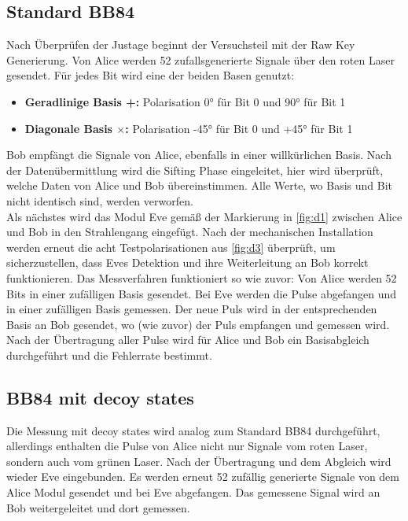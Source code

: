\subsection{Standard BB84}
Nach Überprüfen der Justage beginnt der Versuchsteil mit der Raw Key Generierung.
Von Alice werden 52 zufallsgenerierte Signale über den roten Laser gesendet. Für
jedes Bit wird eine der beiden Basen genutzt:
\begin{itemize}
    \item \textbf{Geradlinige Basis +:} Polarisation 0° für Bit 0 und 90° für Bit 1
    \item \textbf{Diagonale Basis $\times$:} Polarisation -45° für Bit 0 und +45° für Bit 1
\end{itemize}
Bob empfängt die Signale von Alice, ebenfalls in einer willkürlichen Basis. Nach
der Datenübermittlung wird die Sifting Phase eingeleitet, hier wird überprüft,
welche Daten von Alice und Bob übereinstimmen. Alle Werte, wo Basis und Bit nicht
identisch sind, werden verworfen.
\\
\noindent Als nächstes wird das Modul Eve gemäß der Markierung in \autoref{fig:d1}
zwischen Alice und Bob in den Strahlengang eingefügt. Nach der mechanischen 
Installation werden erneut die acht Testpolarisationen aus \autoref{fig:d3}
überprüft, um sicherzustellen, dass Eves Detektion und ihre Weiterleitung an Bob
korrekt funktionieren. Das Messverfahren funktioniert so wie zuvor: Von Alice werden 
52 Bits in einer zufälligen Basis gesendet. Bei Eve werden die Pulse abgefangen 
und in einer zufälligen Basis gemessen. Der neue Puls wird in der entsprechenden 
Basis an Bob gesendet, wo (wie zuvor) der Puls empfangen und gemessen wird. 
Nach der Übertragung aller Pulse wird für Alice und Bob ein Basisabgleich 
durchgeführt und die Fehlerrate bestimmt. 

\subsection{BB84 mit decoy states}
Die Messung mit decoy states wird analog zum Standard BB84 durchgeführt, allerdings
enthalten die Pulse von Alice nicht nur Signale vom roten Laser, sondern auch vom 
grünen Laser. Nach der Übertragung und dem Abgleich wird wieder Eve eingebunden.
Es werden erneut 52 zufällig generierte Signale von dem Alice Modul gesendet 
und bei Eve abgefangen. Das gemessene Signal wird an Bob weitergeleitet und 
dort gemessen.